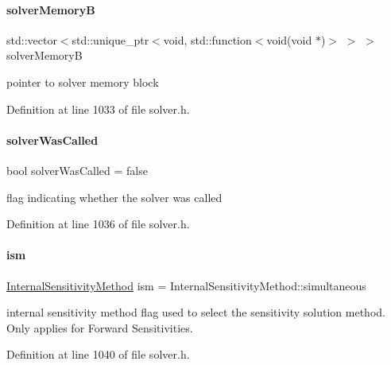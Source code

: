 \paragraph{\texorpdfstring{solver\+MemoryB}{solverMemoryB}}
{\footnotesize\ttfamily std\+::vector$<$std\+::unique\+\_\+ptr$<$void, std\+::function$<$void(void $\ast$)$>$ $>$ $>$ solver\+MemoryB\hspace{0.3cm}{\ttfamily [protected]}}

pointer to solver memory block 

Definition at line 1033 of file solver.\+h.

\mbox{\label{classamici_1_1_solver_a454f49f72b43a33add909d7ac630ce1c}} 
\paragraph{\texorpdfstring{solver\+Was\+Called}{solverWasCalled}}
{\footnotesize\ttfamily bool solver\+Was\+Called = false\hspace{0.3cm}{\ttfamily [protected]}}

flag indicating whether the solver was called 

Definition at line 1036 of file solver.\+h.

\mbox{\label{classamici_1_1_solver_a5b3b5ca18d3932765358bdf278290861}} 
\paragraph{\texorpdfstring{ism}{ism}}
{\footnotesize\ttfamily \mbox{\hyperlink{namespaceamici_aa444c52f0a5638d68702d1ec92f8db87}{Internal\+Sensitivity\+Method}} ism = Internal\+Sensitivity\+Method\+::simultaneous\hspace{0.3cm}{\ttfamily [protected]}}

internal sensitivity method flag used to select the sensitivity solution method. Only applies for Forward Sensitivities. 

Definition at line 1040 of file solver.\+h.

\mbox{\label{classamici_1_1_solver_af71d1353291520f9ba68df79c4b9f053}} 
